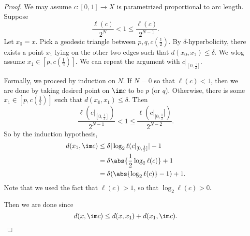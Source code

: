 \documentclass[a4paper]{article}
\begin{document}
\begin{proof}
  We may assume $c: [0, 1] \to X$ is parametrized proportional to arc length. Suppose
  \[
    \frac{\ell(c)}{2^N} < 1 \leq \frac{\ell(c)}{2^{N - 1}}.
  \]
  Let $x_0 = x$. Pick a geodesic triangle between $p, q, c(\frac{1}{2})$. By $\delta$-hyperbolicity, there exists a point $x_1$ lying on the other two edges such that $d(x_0, x_1) \leq \delta$. We wlog assume $x_1 \in [p, c(\frac{1}{2})]$. We can repeat the argument with $c|_{[0, \frac{1}{2}]}$.

  \begin{center}
  \end{center}

  Formally, we proceed by induction on $N$. If $N = 0$ so that $\ell(c) < 1$, then we are done by taking desired point on $\im c$ to be $p$ (or $q$). Otherwise, there is some $x_1 \in [p, c(\frac{1}{2})]$ such that $d(x_0, x_1) \leq \delta$. Then
  \[
    \frac{\ell(c|_{[0, \frac{1}{2}]})}{2^{N - 1}} < 1 \leq \frac{\ell(c|_{[0, \frac{1}2}])}{2^{N - 2}}.
  \]
  So by the induction hypothesis, 
  \begin{align*}
    d(x_1, \im c) &\leq \delta |\log_2 \ell(c|_{[0, \frac{1}{2}]}| + 1\\
    &= \delta \abs{ \frac{1}{2}\log_2 \ell(c)} + 1\\
    &= \delta (\abs{\log_2 \ell(c)} - 1) + 1.
  \end{align*}
  Note that we used the fact that $\ell(c) > 1$, so that $\log_2 \ell(c) > 0$.

  Then we are done since
  \[
    d(x, \im c) \leq d(x, x_1) + d(x_1, \im c).
  \]
\end{proof}
\end{document}
